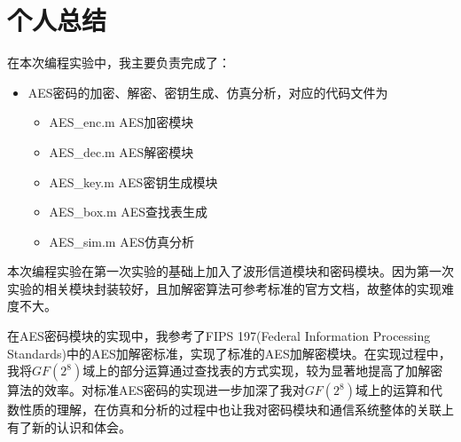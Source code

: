 \part{个人总结}

在本次编程实验中，我主要负责完成了：

\begin{itemize}
    \item AES密码的加密、解密、密钥生成、仿真分析，对应的代码文件为
    \begin{itemize}
        \item AES\_enc.m AES加密模块
        \item AES\_dec.m AES解密模块
        \item AES\_key.m AES密钥生成模块
        \item AES\_box.m AES查找表生成
        \item AES\_sim.m AES仿真分析
    \end{itemize}
\end{itemize}

本次编程实验在第一次实验的基础上加入了波形信道模块和密码模块。因为第一次实验的相关模块封装较好，且加解密算法可参考标准的官方文档，故整体的实现难度不大。

在AES密码模块的实现中，我参考了FIPS 197(Federal Information Processing Standards)中的AES加解密标准，实现了标准的AES加解密模块。在实现过程中，我将$GF(2^8)$域上的部分运算通过查找表的方式实现，较为显著地提高了加解密算法的效率。对标准AES密码的实现进一步加深了我对$GF(2^8)$域上的运算和代数性质的理解，在仿真和分析的过程中也让我对密码模块和通信系统整体的关联上有了新的认识和体会。
